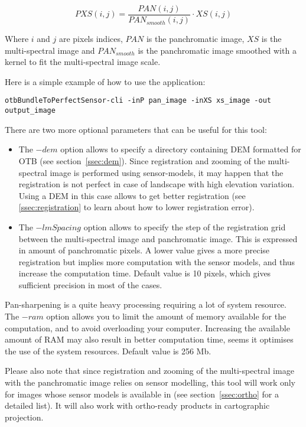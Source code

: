 \begin{equation}
PXS(i,j) = \frac{PAN(i,j)}{PAN_{smooth}(i,j)} \cdot XS(i,j)
\end{equation}

Where $i$ and $j$ are pixels indices, $PAN$ is the panchromatic image,
$XS$ is the multi-spectral image and $PAN_{smooth}$ is the
panchromatic image smoothed with a kernel to fit the multi-spectral
image scale.

Here is a simple example of how to use the
 application:

\begin{verbatim}
otbBundleToPerfectSensor-cli -inP pan_image -inXS xs_image -out output_image
\end{verbatim}

There are two more optional parameters that can be useful for this
tool:
\begin{itemize}
\item The $-dem$ option allows to specify a directory containing DEM
  formatted for OTB (see section~\ref{ssec:dem}). Since registration
  and zooming of the multi-spectral image is performed using
  sensor-models, it may happen that the registration is not perfect in
  case of landscape with high elevation variation. Using a DEM in this
  case allows to get better registration (see \ref{ssec:registration}
  to learn about how to lower registration error).
\item The $-lmSpacing$ option allows to specify the step of the
  registration grid between the multi-spectral image and panchromatic
  image. This is expressed in amount of panchromatic pixels. A lower
  value gives a more precise registration but implies more computation
  with the sensor models, and thus increase the computation
  time. Default value is 10 pixels, which gives sufficient precision
  in most of the cases.
\end{itemize}

Pan-sharpening is a quite heavy processing requiring a lot of system
resource. The $-ram$ option allows you to limit the amount of memory
available for the computation, and to avoid overloading your
computer. Increasing the available amount of RAM may also result in
better computation time, seems it optimises the use of the system
resources. Default value is 256 Mb.

Please also note that since registration and zooming of the
multi-spectral image with the panchromatic image relies on sensor
modelling, this tool will work only for images whose sensor models is
available in \otb (see section~\ref{ssec:ortho} for a detailed
list). It will also work with ortho-ready products in cartographic
projection.

